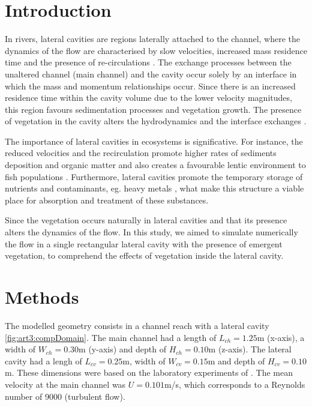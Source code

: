 \section{Introduction}
In rivers, lateral cavities are regions laterally attached to the channel, where the dynamics of the flow are characterised by slow velocities, increased mass residence time and the presence of re-circulations \cite{chang_constantinescu_park_2006}. The exchange processes between the unaltered channel (main channel) and the cavity occur solely by an interface in which the mass and momentum relationships occur. Since there is an increased residence time within the cavity volume due to the lower velocity magnitudes, this region favours sedimentation processes and vegetation growth. The presence of vegetation in the cavity alters the hydrodynamics and the interface exchanges \cite{xiang2019}.

The importance of lateral cavities in ecosystems is significative. For instance, the reduced velocities and the recirculation promote higher rates of sediments deposition and organic matter \cite{juez2018} and also creates a favourable lentic environment to fish populations \cite{Landwust2006}. Furthermore, lateral cavities promote the temporary storage of nutrients and contaminants, eg. heavy metals \cite{Argerich2011,xiang2019}, what make this structure a viable place for absorption and treatment of these substances.

Since the vegetation occurs naturally in lateral cavities and that its presence alters the dynamics of the flow. In this study, we aimed to simulate numerically the flow in a single rectangular lateral cavity with the presence of emergent vegetation, to comprehend the effects of vegetation inside the lateral cavity.

\section{Methods}
The modelled geometry consists in a channel reach with a lateral cavity \ref{fig:art3:compDomain}. The main channel had a length of $L_{ch}=1.25$m (x-axis), a width of $W_{ch}=0.30$m (y-axis) and depth of $H_{ch}=0.10$m (z-axis). The lateral cavity had a lengh of $L_{cv}=0.25$m, width of $W_{cv}=0.15$m and depth of $H_{cv}=0.10$m. These dimensions were based on the laboratory experiments of \textcite{xiang2019}. The mean velocity at the main channel was $U=0.101$m/s, which corresponds to a Reynolds number of 9000 (turbulent flow).

